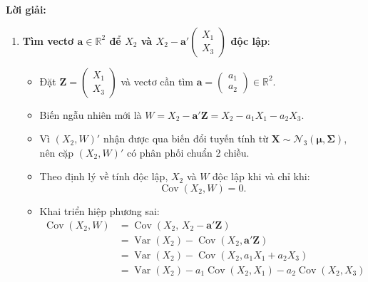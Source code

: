 \documentclass[11pt,a4paper]{article}
\newenvironment{solution}{%
  \par\noindent\textbf{Lời giải:}\ \ignorespaces
}{\par}
\theoremstyle{definition}
\newcommand{\answer}[1]{\boxed{#1}}
\begin{document}
\begin{solution}
\begin{enumerate}[label=\textbf{\alph*)}]
\begin{itemize}
\[    \]
    Nhân tiếp với $\mathbf{c}'$:
    \[
    \mathbf{c}'(\boldsymbol{\Sigma}\mathbf{c}) = \begin{pmatrix} 3 & -2 & 1 \end{pmatrix} \begin{pmatrix} 2 \\ -1 \\ 1 \end{pmatrix} = 3(2) + (-2)(-1) + 1(1) = 6 + 2 + 1 = 9.
    \]
  \end{itemize}
  \textbf{Kết luận}:
  \[
  3X_1 - 2X_2 + X_3 \sim \answer{\mathcal{N}(13, 9)}.
  \]

  \item \textbf{Tìm vectơ $\mathbf{a} \in \mathbb{R}^2$ để $X_2$ và $X_2 - \mathbf{a}' \begin{pmatrix} X_1 \\ X_3 \end{pmatrix}$ độc lập}:
  \begin{itemize}
    \item Đặt $\mathbf{Z} = \begin{pmatrix} X_1 \\ X_3 \end{pmatrix}$ và vectơ cần tìm $\mathbf{a} = \begin{pmatrix} a_1 \\ a_2 \end{pmatrix} \in \mathbb{R}^2$.
    \item Biến ngẫu nhiên mới là $W = X_2 - \mathbf{a}'\mathbf{Z} = X_2 - a_1 X_1 - a_2 X_3$.
    \item Vì $(X_2, W)'$ nhận được qua biến đổi tuyến tính từ $\mathbf{X} \sim \mathcal{N}_3(\boldsymbol{\mu}, \boldsymbol{\Sigma})$, nên cặp $(X_2, W)'$ có phân phối chuẩn 2 chiều.
    \item Theo định lý về tính độc lập, $X_2$ và $W$ độc lập khi và chỉ khi:
    \[
    \operatorname{Cov}(X_2, W) = 0.
    \]
    \item Khai triển hiệp phương sai:
    \begin{align*}
      \operatorname{Cov}(X_2, W) &= \operatorname{Cov}\left(X_2, \, X_2 - \mathbf{a}'\mathbf{Z}\right) \\
      &= \operatorname{Var}(X_2) - \operatorname{Cov}(X_2, \mathbf{a}'\mathbf{Z}) \\
      &= \operatorname{Var}(X_2) - \operatorname{Cov}(X_2, a_1 X_1 + a_2 X_3) \\
      &= \operatorname{Var}(X_2) - a_1 \operatorname{Cov}(X_2, X_1) - a_2 \operatorname{Cov}(X_2, X_3) \\

\end{align*}
\end{itemize}
\end{enumerate}
\end{solution}
\end{document}
